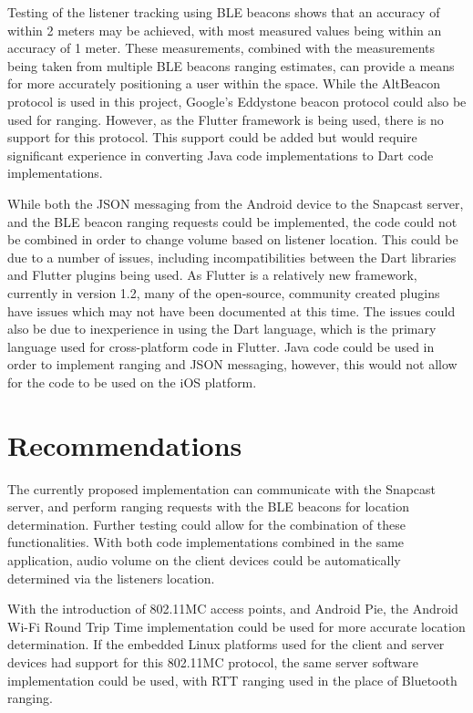 \documentclass[11pt,a4paper,headinclude=false,footinclude=false]{scrreprt}
\begin{document}
Testing of the listener tracking using BLE beacons shows that an
accuracy of within 2 meters may be achieved, with most measured values
being within an accuracy of 1 meter. These measurements, combined with
the measurements being taken from multiple BLE beacons ranging
estimates, can provide a means for more accurately positioning a user
within the space. While the AltBeacon protocol is used in this project,
Google's Eddystone beacon protocol could also be used for ranging.
However, as the Flutter framework is being used, there is no support for
this protocol. This support could be added but would require significant
experience in converting Java code implementations to Dart code
implementations.

While both the JSON messaging from the Android device to the Snapcast
server, and the BLE beacon ranging requests could be implemented, the
code could not be combined in order to change volume based on listener
location. This could be due to a number of issues, including
incompatibilities between the Dart libraries and Flutter plugins being
used. As Flutter is a relatively new framework, currently in version
1.2, many of the open-source, community created plugins have issues
which may not have been documented at this time. The issues could also
be due to inexperience in using the Dart language, which is the primary
language used for cross-platform code in Flutter. Java code could be
used in order to implement ranging and JSON messaging, however, this
would not allow for the code to be used on the iOS platform.

\chapter{Recommendations}\label{recommendations}

The currently proposed implementation can communicate with the Snapcast
server, and perform ranging requests with the BLE beacons for location
determination. Further testing could allow for the combination of these
functionalities. With both code implementations combined in the same
application, audio volume on the client devices could be automatically
determined via the listeners location.

With the introduction of 802.11MC access points, and Android Pie, the
Android Wi-Fi Round Trip Time implementation could be used for more
accurate location determination. If the embedded Linux platforms used
for the client and server devices had support for this 802.11MC
protocol, the same server software implementation could be used, with
RTT ranging used in the place of Bluetooth ranging.
\end{document}
